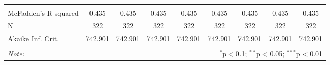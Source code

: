 \begin{sidewaystable}[!htbp]
\begin{tabular}{@{\extracolsep{5pt}}lcccccccc}
\hline \\[-1.8ex] 
McFadden's R squared & 0.435 & 0.435 & 0.435 & 0.435 & 0.435 & 0.435 & 0.435 & 0.435 \\ 
N & 322 & 322 & 322 & 322 & 322 & 322 & 322 & 322 \\ 
Akaike Inf. Crit. & 742.901 & 742.901 & 742.901 & 742.901 & 742.901 & 742.901 & 742.901 & 742.901 \\ 
\hline 
\hline \\[-1.8ex] 
\textit{Note:}  & \multicolumn{8}{r}{$^{*}$p$<$0.1; $^{**}$p$<$0.05; $^{***}$p$<$0.01} \\ 
\end{tabular} 
\end{sidewaystable} 
